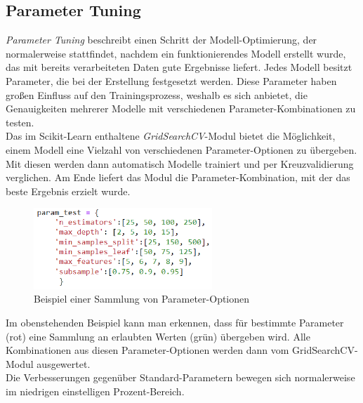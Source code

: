 \subsection{Parameter Tuning}
\textit{Parameter Tuning} beschreibt einen Schritt der Modell-Optimierung, der normalerweise stattfindet, 
nachdem ein funktionierendes Modell erstellt wurde, das mit bereits verarbeiteten Daten gute Ergebnisse liefert.
Jedes Modell besitzt Parameter, die bei der Erstellung festgesetzt werden. Diese Parameter haben 
großen Einfluss auf den Trainingsprozess, weshalb es sich anbietet, die Genauigkeiten mehrerer Modelle 
mit verschiedenen Parameter-Kombinationen zu testen.\\
Das im Scikit-Learn enthaltene \textit{GridSearchCV}-Modul
bietet die Möglichkeit, einem Modell eine Vielzahl von verschiedenen Parameter-Optionen zu übergeben. Mit diesen 
werden dann automatisch Modelle trainiert und per Kreuzvalidierung verglichen. Am Ende liefert das Modul 
die Parameter-Kombination, mit der das beste Ergebnis erzielt wurde.\\

\begin{figure}[h]
    \centering
    \includegraphics[width=0.6\textwidth]{pic/param_test.png}
    \caption{Beispiel einer Sammlung von Parameter-Optionen}
    \label{fig:Param_Test}
\end{figure}

Im obenstehenden Beispiel kann man erkennen, dass für bestimmte Parameter (rot) eine Sammlung an erlaubten 
Werten (grün) übergeben wird. Alle Kombinationen aus diesen Parameter-Optionen werden dann vom 
GridSearchCV-Modul ausgewertet.\\
Die Verbesserungen gegenüber Standard-Parametern bewegen sich normalerweise im niedrigen einstelligen 
Prozent-Bereich.

